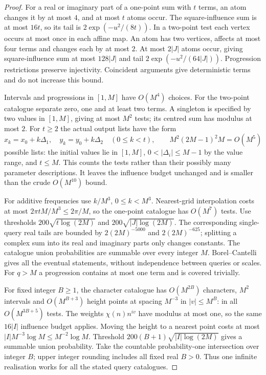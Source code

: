 \documentclass[11pt]{article}
\theoremstyle{definition}
\theoremstyle{remark}
\numberwithin{equation}{section}
\begin{document}
\begin{proof}
For a real or imaginary part of a one-point sum with $t$ terms, an atom changes it by at most $4$,
and at most $t$ atoms occur. The square-influence sum is at most $16t$, so its tail is
$2\exp(-u^2/(8t))$. In a two-point test each vertex occurs at most once in each affine map.
An atom has two vertices, affects at most four terms and changes each by at most $2$.
At most $2|J|$ atoms occur, giving square-influence sum at most $128|J|$ and tail
$2\exp(-u^2/(64|J|))$. Progression restrictions preserve injectivity. Coincident arguments give
deterministic terms and do not increase this bound.

Intervals and progressions in $[1,M]$ have $O(M^4)$ choices. For the two-point catalogue separate zero,
one and at least two terms. A singleton is specified by two values in $[1,M]$, giving at most $M^2$
tests; its centred sum has modulus at most $2$. For $t\ge2$ the actual output lists have the form
\begin{equation}\label{eq:b-query-lists}
 x_k=x_0+k\Delta_1,\quad y_k=y_0+k\Delta_2\quad(0\le k<t),\qquad
 M^2(2M-1)^2M=O(M^5)
\end{equation}
possible lists: the initial values lie in $[1,M]$, $0<|\Delta_i|\le M-1$ by the value range,
and $t\le M$. This counts the tests rather than their possibly many parameter descriptions.
It leaves the influence budget unchanged and is smaller than the crude $O(M^{10})$ bound.

For additive frequencies use $k/M^3$, $0\le k<M^3$. Nearest-grid interpolation costs at most
$2\pi tM/M^3\le2\pi/M$, so the one-point catalogue has $O(M^7)$ tests.
Use thresholds $200\sqrt{t\log(2M)}$ and $200\sqrt{|J|\log(2M)}$.
The corresponding single-query real tails are bounded by
$2(2M)^{-5000}$ and $2(2M)^{-625}$; splitting a complex sum into its real and imaginary parts only
changes constants. The catalogue union probabilities are summable over every integer $M$.
Borel--Cantelli gives all the eventual statements, without independence between queries or scales.
For $q>M$ a progression contains at most one term and is covered trivially.

For fixed integer $B\ge1$, the character catalogue has $O(M^{2B})$ characters, $M^2$ intervals and
$O(M^{B+3})$ height points at spacing $M^{-3}$ in $|v|\le M^B$: in all $O(M^{3B+5})$ tests.
The weights $\chi(n)n^{iv}$ have modulus at most one, so the same $16|I|$ influence budget applies.
Moving the height to a nearest point costs at most
$|I|M^{-3}\log M\le M^{-2}\log M$.
Threshold $200(B+1)\sqrt{|I|\log(2M)}$ gives a summable union probability.
Take the countable probability-one intersection over integer $B$; upper integer rounding includes all
fixed real $B>0$. Thus one infinite realisation works for all the stated query catalogues.
\end{proof}
\end{document}
